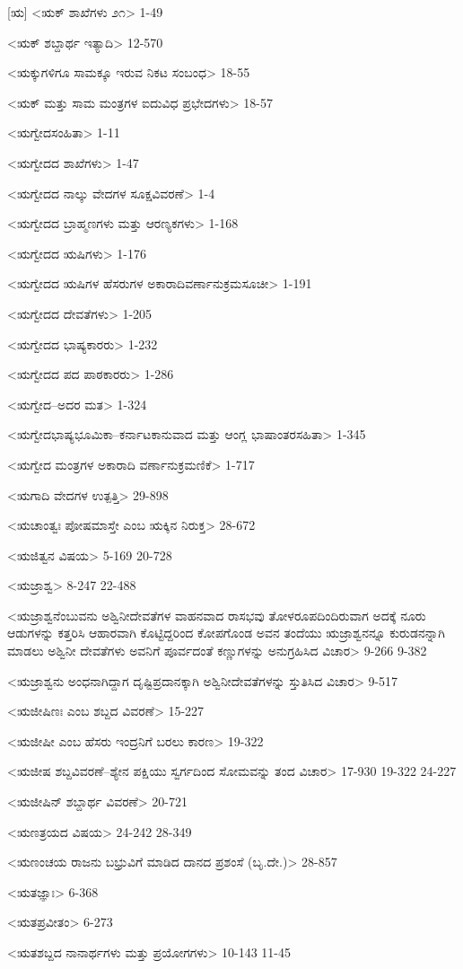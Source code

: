 [ಋ]
<ಋಕ್‍ ಶಾಖೆಗಳು ೨೧>
1-49

<ಋಕ್‍ ಶಬ್ದಾರ್ಥ ಇತ್ಯಾದಿ>
12-570

<ಋಕ್ಕುಗಳಿಗೂ ಸಾಮಕ್ಕೂ ಇರುವ ನಿಕಟ ಸಂಬಂಧ>
18-55

<ಋಕ್‍ ಮತ್ತು ಸಾಮ ಮಂತ್ರಗಳ ಐದುವಿಧ ಪ್ರಭೇದಗಳು>
18-57

<ಋಗ್ವೇದಸಂಹಿತಾ>
1-11

<ಋಗ್ವೇದದ ಶಾಖೆಗಳು>
1-47

<ಋಗ್ವೇದದ ನಾಲ್ಕು ವೇದಗಳ ಸೂಕ್ಷವಿವರಣೆ>
1-4

<ಋಗ್ವೇದದ ಬ್ರಾಹ್ಮಣಗಳು ಮತ್ತು ಆರಣ್ಯಕಗಳು>
1-168

<ಋಗ್ವೇದದ ಋಷಿಗಳು>
1-176

<ಋಗ್ವೇದದ ಋಷಿಗಳ ಹೆಸರುಗಳ ಅಕಾರಾದಿವರ್ಣಾನುಕ್ರಮಸೂಚೀ>
1-191

<ಋಗ್ವೇದದ ದೇವತೆಗಳು>
1-205

<ಋಗ್ವೇದದ ಭಾಷ್ಯಕಾರರು>
1-232

<ಋಗ್ವೇದದ ಪದ ಪಾಠಕಾರರು>
1-286

<ಋಗ್ವೇದ–ಅದರ ಮತ>
1-324

<ಋಗ್ವೇದಭಾಷ್ಯಭೂಮಿಕಾ–ಕರ್ನಾಟಕಾನುವಾದ ಮತ್ತು ಆಂಗ್ಲ ಭಾಷಾಂತರಸಹಿತಾ>
1-345

<ಋಗ್ವೇದ ಮಂತ್ರಗಳ ಅಕಾರಾದಿ ವರ್ಣಾನುಕ್ರಮಣಿಕೆ>
1-717

<ಋಗಾದಿ ವೇದಗಳ ಉತ್ಪತ್ತಿ>
29-898

<ಋಚಾಂತ್ವಃ ಪೋಷಮಾಸ್ತೇ ಎಂಬ ಋಕ್ಕಿನ ನಿರುಕ್ತ>
28-672

<ಋಜಿತ್ವನ ವಿಷಯ>
5-169
20-728

<ಋಜ್ರಾಶ್ವ>
8-247
22-488

<ಋಜ್ರಾಶ್ವನೆಂಬುವನು ಅಶ್ವಿನೀದೇವತೆಗಳ ವಾಹನವಾದ ರಾಸಭವು ತೋಳರೂಪದಿಂದಿರುವಾಗ ಅದಕ್ಕೆ ನೂರು ಆಡುಗಳನ್ನು ಕತ್ತರಿಸಿ ಆಹಾರವಾಗಿ ಕೊಟ್ಟಿದ್ದರಿಂದ ಕೋಪಗೊಂಡ ಅವನ ತಂದೆಯು ಋಜ್ರಾಶ್ವನನ್ನೂ ಕುರುಡನನ್ನಾಗಿ ಮಾಡಲು ಅಶ್ವಿನೀ ದೇವತೆಗಳು ಅವನಿಗೆ ಪೂರ್ವದಂತೆ ಕಣ್ಣುಗಳನ್ನು ಅನುಗ್ರಹಿಸಿದ ವಿಚಾರ>
9-266 
9-382

<ಋಜ್ರಾಶ್ವನು ಅಂಧನಾಗಿದ್ದಾಗ ದೃಷ್ಟಿಪ್ರದಾನಕ್ಕಾಗಿ ಅಶ್ವಿನೀದೇವತೆಗಳನ್ನು ಸ್ತುತಿಸಿದ ವಿಚಾರ>
9-517

<ಋಜೀಷಿಣಃ ಎಂಬ ಶಬ್ದದ ವಿವರಣೆ>
15-227

<ಋಜೀಷೀ ಎಂಬ ಹೆಸರು ಇಂದ್ರನಿಗೆ ಬರಲು ಕಾರಣ>
19-322

<ಋಜೀಷ ಶಬ್ದವಿವರಣೆ–ಶ್ಯೇನ ಪಕ್ಷಿಯು ಸ್ವರ್ಗದಿಂದ ಸೋಮವನ್ನು ತಂದ ವಿಚಾರ>
17-930 
19-322 
24-227

<ಋಜೀಷಿನ್‍ ಶಬ್ದಾರ್ಥ ವಿವರಣೆ>
20-721

<ಋಣತ್ರಯದ ವಿಷಯ>
24-242 
28-349

<ಋಣಂಚಯ ರಾಜನು ಬಭ್ರುವಿಗೆ ಮಾಡಿದ ದಾನದ ಪ್ರಶಂಸೆ (ಬೃ.ದೇ.)>
28-857

<ಋತಜ್ಞಾಃ>
6-368

<ಋತಪ್ರವೀತಂ>
6-273

<ಋತಶಬ್ದದ ನಾನಾರ್ಥಗಳು ಮತ್ತು ಪ್ರಯೋಗಗಳು>
10-143 
11-45

